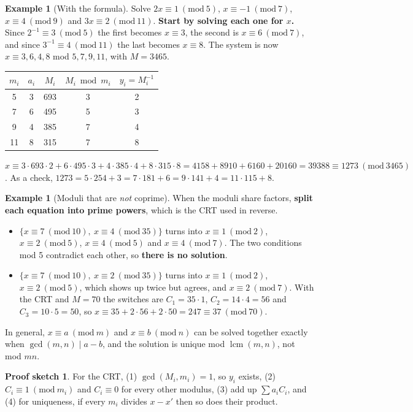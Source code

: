 \documentclass[11pt,a4paper]{article}
\theoremstyle{definition}
\newtheorem{example}[theorem]{Example}
\newcommand{\md}[1]{\ (\mathrm{mod}\ #1)}
\DeclareMathOperator{\lcm}{lcm}
\theoremstyle{noteit}
\theoremstyle{note}
\newtheorem*{sketch}{Proof sketch}
\begin{document}
\begin{example}[With the formula]
Solve $2x\equiv1\md5$, $x\equiv-1\md7$, $x\equiv4\md9$ and $3x\equiv2\md{11}$. \textbf{Start by solving each one for $x$.} Since $2^{-1}\equiv3\md 5$ the first becomes $x\equiv3$, the second is $x\equiv6\md7$, and since $3^{-1}\equiv4\md{11}$ the last becomes $x\equiv8$. The system is now $x\equiv3,6,4,8$ mod $5,7,9,11$, with $M=3465$.
\begin{center}
\begin{tabular}{ccccc}
\toprule
$m_i$ & $a_i$ & $M_i$ & $M_i\bmod m_i$ & $y_i=M_i^{-1}$\\
\midrule
5 & 3 & 693 & 3 & 2\\
7 & 6 & 495 & 5 & 3\\
9 & 4 & 385 & 7 & 4\\
11 & 8 & 315 & 7 & 8\\
\bottomrule
\end{tabular}
\end{center}
$x\equiv3\cdot693\cdot2+6\cdot495\cdot3+4\cdot385\cdot4+8\cdot315\cdot8=4158+8910+6160+20160=39388\equiv1273\md{3465}$.
As a check, $1273=5\cdot254+3=7\cdot181+6=9\cdot141+4=11\cdot115+8$.
\end{example}

\begin{example}[Moduli that are \emph{not} coprime]
When the moduli share factors, \textbf{split each equation into prime powers}, which is the CRT used in reverse.
\begin{itemize}
\item $\{x\equiv7\md{10},\ x\equiv4\md{35}\}$ turns into $x\equiv1\md2$, $x\equiv2\md5$, $x\equiv4\md5$ and $x\equiv4\md7$. The two conditions mod 5 contradict each other, so \textbf{there is no solution}.
\item $\{x\equiv7\md{10},\ x\equiv2\md{35}\}$ turns into $x\equiv1\md2$, $x\equiv2\md5$, which shows up twice but agrees, and $x\equiv2\md7$. With the CRT and $M=70$ the switches are $C_1=35\cdot1$, $C_2=14\cdot4=56$ and $C_3=10\cdot5=50$, so $x\equiv35+2\cdot56+2\cdot50=247\equiv37\md{70}$.
\end{itemize}
In general, $x\equiv a\md m$ and $x\equiv b\md n$ can be solved together exactly when $\gcd(m,n)\mid a-b$, and the solution is unique mod $\lcm(m,n)$, not mod $mn$.
\end{example}

\begin{sketch}
For the CRT, (1) $\gcd(M_i,m_i)=1$, so $y_i$ exists, (2) $C_i\equiv1\md{m_i}$ and $C_i\equiv0$ for every other modulus, (3) add up $\sum a_iC_i$, and (4) for uniqueness, if every $m_i$ divides $x-x'$ then so does their product.
\end{sketch}
\end{document}
